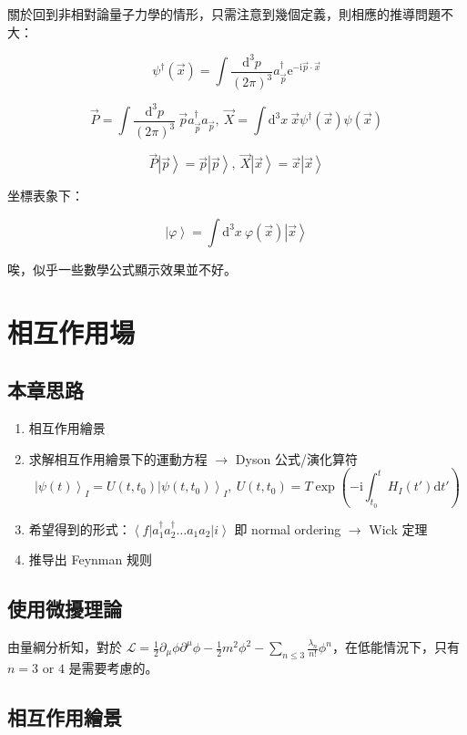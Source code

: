 \documentclass{article}
\begin{document}
關於回到非相對論量子力學的情形，只需注意到幾個定義，則相應的推導問題不大：

$$\psi^{\dagger}(\vec{x})=\int\frac{\mathrm{d}^3p}{(2\pi)^3}a_{\vec{p}}^{\dagger}\mathrm{e}^{-\mathrm{i}\vec{p}\cdot\vec{x}}$$

$$\vec{P}=\int\frac{\mathrm{d}^3p}{(2\pi)^3}\ \vec{p}a_{\vec{p}}^{\dagger}a_{\vec{p}},\ \vec{X}=\int\mathrm{d}^3x\ \vec{x}\psi^{\dagger}(\vec{x})\psi(\vec{x})$$

$$\vec{P}\left|\vec{p}\right\rangle=\vec{p}\left|\vec{p}\right\rangle,\ \vec{X}\left|\vec{x}\right\rangle=\vec{x}\left|\vec{x}\right\rangle$$

坐標表象下：

$$\left|\varphi\right\rangle=\int\mathrm{d}^3x\ \varphi(\vec{x})\left|\vec{x}\right\rangle$$

唉，似乎一些數學公式顯示效果並不好。

\section{相互作用場}

\subsection{本章思路}

\begin{enumerate}
  \item 相互作用繪景
  \item 求解相互作用繪景下的運動方程 $\rightarrow$ Dyson 公式/演化算符 $$\left|\psi(t)\right\rangle_I=U(t,t_0)\left|\psi(t,t_0)\right\rangle_I,\ U(t,t_0)=T\exp\left(-\mathrm{i}\int^t_{t_0}H_I(t')\mathrm{d}t'\right)$$
  \item 希望得到的形式：$\left\langle f\right|a_1^{\dagger}a_2^{\dagger}\dots a_1a_2\left|i\right\rangle$ 即 normal ordering $\rightarrow$ Wick 定理
  \item 推导出 Feynman 规则
\end{enumerate}

\subsection{使用微擾理論}

由量綱分析知，對於 $\mathcal{L}=\frac{1}{2}\partial_{\mu}\phi\partial^{\mu}\phi-\frac{1}{2}m^2\phi^2-\sum_{n\leq 3}\frac{\lambda_n}{n!}\phi^n$，在低能情況下，只有 $n=3\text{ or }4$ 是需要考慮的。

\subsection{相互作用繪景}
\end{document}
